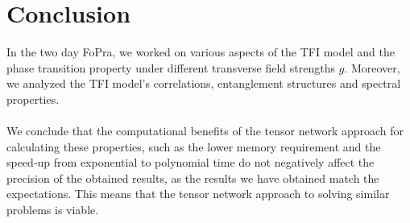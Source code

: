 \section{Conclusion}

In the two day FoPra, we worked on various aspects of the TFI model and the phase transition property under different transverse field strengths $g$. Moreover, we analyzed the TFI model's correlations, entanglement structures and spectral properties.
\\\\
We conclude that the computational benefits of the tensor network approach for calculating these properties, such as the lower memory requirement and the speed-up from exponential to polynomial time do not negatively affect the precision of the obtained results, as the results we have obtained match the expectations. This means that the tensor network approach to solving similar problems is viable.
